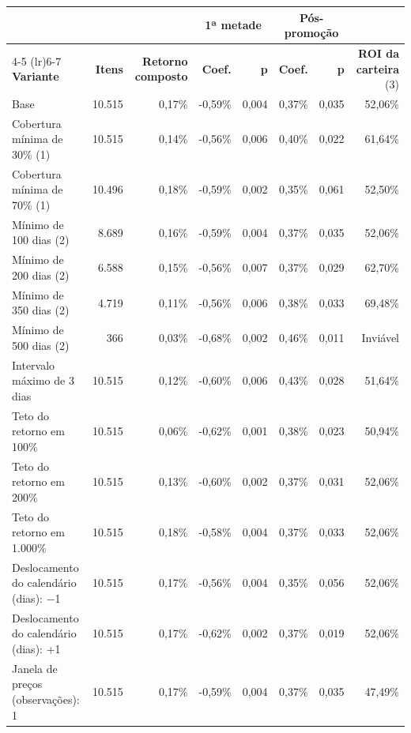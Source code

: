 \begingroup
\setlength{}
\setlength{}
\fontsize{6.0pt}{7.2pt}\selectfont

\setlength{\LTpost}{0mm}
\begin{longtable}{@{\extracolsep{\fill}}lrrrrrrr}

\toprule
 &  &  & \multicolumn{2}{c}{\textbf{1ª metade}} & \multicolumn{2}{c}{\textbf{Pós-promoção}} &  \\ 
\cmidrule(lr){4-5} \cmidrule(lr){6-7}
\textbf{Variante} & \textbf{Itens} & \textbf{Retorno composto} & \textbf{Coef.} & \textbf{p} & \textbf{Coef.} & \textbf{p} & \textbf{ROI da carteira} (3) \\ 
\midrule\addlinespace[2.5pt]
Base & 10.515 & 0,17\% & -0,59\% & 0,004 & 0,37\% & 0,035 & 52,06\% \\
Cobertura mínima de 30\% (1) & 10.515 & 0,14\% & -0,56\% & 0,006 & 0,40\% & 0,022 & 61,64\% \\
Cobertura mínima de 70\% (1) & 10.496 & 0,18\% & -0,59\% & 0,002 & 0,35\% & 0,061 & 52,50\% \\
Mínimo de 100 dias (2) & 8.689 & 0,16\% & -0,59\% & 0,004 & 0,37\% & 0,035 & 52,06\% \\
Mínimo de 200 dias (2) & 6.588 & 0,15\% & -0,56\% & 0,007 & 0,37\% & 0,029 & 62,70\% \\
Mínimo de 350 dias (2) & 4.719 & 0,11\% & -0,56\% & 0,006 & 0,38\% & 0,033 & 69,48\% \\
Mínimo de 500 dias (2) & 366 & 0,03\% & -0,68\% & 0,002 & 0,46\% & 0,011 & Inviável \\
Intervalo máximo de 3 dias & 10.515 & 0,12\% & -0,60\% & 0,006 & 0,43\% & 0,028 & 51,64\% \\
Teto do retorno em 100\% & 10.515 & 0,06\% & -0,62\% & 0,001 & 0,38\% & 0,023 & 50,94\% \\
Teto do retorno em 200\% & 10.515 & 0,13\% & -0,60\% & 0,002 & 0,37\% & 0,031 & 52,06\% \\
Teto do retorno em 1.000\% & 10.515 & 0,18\% & -0,58\% & 0,004 & 0,37\% & 0,033 & 52,06\% \\
Deslocamento do calendário (dias): −1 & 10.515 & 0,17\% & -0,56\% & 0,004 & 0,35\% & 0,056 & 52,06\% \\
Deslocamento do calendário (dias): +1 & 10.515 & 0,17\% & -0,62\% & 0,002 & 0,37\% & 0,019 & 52,06\% \\
Janela de preços (observações): 1 & 10.515 & 0,17\% & -0,59\% & 0,004 & 0,37\% & 0,035 & 47,49\% \\
\bottomrule
\end{longtable}

